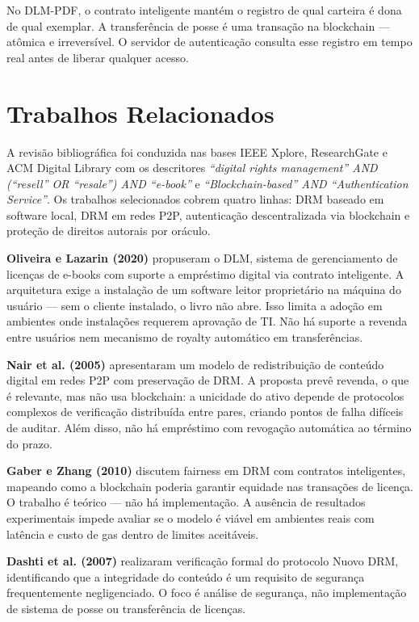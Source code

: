 \documentclass[12pt]{article}
\begin{document}
No DLM-PDF, o contrato inteligente mantém o registro de qual carteira é dona de qual exemplar. A transferência de posse é uma transação na blockchain — atômica e irreversível. O servidor de autenticação consulta esse registro em tempo real antes de liberar qualquer acesso.

\section{Trabalhos Relacionados}

A revisão bibliográfica foi conduzida nas bases IEEE Xplore, ResearchGate e ACM Digital Library com os descritores \textit{``digital rights management'' AND (``resell'' OR ``resale'') AND ``e-book''} e \textit{``Blockchain-based'' AND ``Authentication Service''}. Os trabalhos selecionados cobrem quatro linhas: DRM baseado em software local, DRM em redes P2P, autenticação descentralizada via blockchain e proteção de direitos autorais por oráculo.

\textbf{Oliveira e Lazarin (2020)} propuseram o DLM, sistema de gerenciamento de licenças de e-books com suporte a empréstimo digital via contrato inteligente. A arquitetura exige a instalação de um software leitor proprietário na máquina do usuário — sem o cliente instalado, o livro não abre. Isso limita a adoção em ambientes onde instalações requerem aprovação de TI. Não há suporte a revenda entre usuários nem mecanismo de royalty automático em transferências.

\textbf{Nair et al. (2005)} apresentaram um modelo de redistribuição de conteúdo digital em redes P2P com preservação de DRM. A proposta prevê revenda, o que é relevante, mas não usa blockchain: a unicidade do ativo depende de protocolos complexos de verificação distribuída entre pares, criando pontos de falha difíceis de auditar. Além disso, não há empréstimo com revogação automática ao término do prazo.

\textbf{Gaber e Zhang (2010)} discutem fairness em DRM com contratos inteligentes, mapeando como a blockchain poderia garantir equidade nas transações de licença. O trabalho é teórico — não há implementação. A ausência de resultados experimentais impede avaliar se o modelo é viável em ambientes reais com latência e custo de gas dentro de limites aceitáveis.

\textbf{Dashti et al. (2007)} realizaram verificação formal do protocolo Nuovo DRM, identificando que a integridade do conteúdo é um requisito de segurança frequentemente negligenciado. O foco é análise de segurança, não implementação de sistema de posse ou transferência de licenças.
\end{document}
